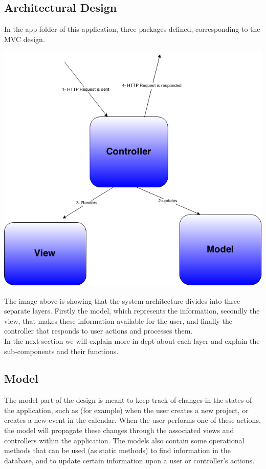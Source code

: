 \subsection{Architectural Design} %
\label{sub:arichtectural_design}
%

In the app folder of this application, three packages defined, corresponding to the MVC design. 
\begin{center}
\includegraphics[scale=0.3]{./img/dsgn_img/MVCdiag.png}
	
\end{center}

The image above is showing that the system architecture divides into three separate layers. Firstly the model, which represents the information, 
secondly the view, that makes these information available for the user, and finally the controller that responds to user actions and processes them. \\
In the next section we will explain more in-dept about each layer and explain the sub-components and their functions. 

\subsection{Model} %
\label{sub:design_rationale}
The model part of the design is meant to keep track of changes in the states of the application, such as (for example) when the user creates a new
project, or creates a new event in the calendar. When the user performs one of these actions, the model will propagate these changes through the 
associated views and controllers within the application. The models also contain some operational methods that can be used (as static methods) to find 
information in the database, and to update certain information upon a user or controller's actions.

